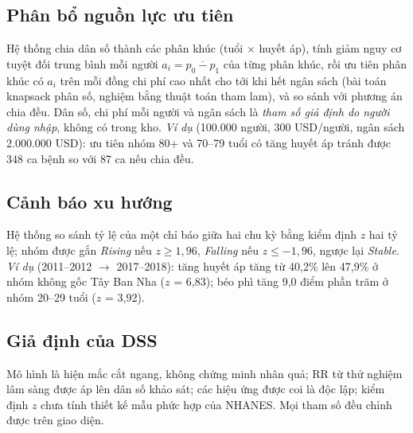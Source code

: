 \subsection{Phân bổ nguồn lực ưu tiên}
Hệ thống chia dân số thành các phân khúc (tuổi $\times$ huyết áp), tính giảm nguy cơ tuyệt đối trung bình mỗi người $a_i=\overline{p_0-p_1}$ của từng phân khúc, rồi ưu tiên phân khúc có $a_i$ trên mỗi đồng chi phí cao nhất cho tới khi hết ngân sách (bài toán knapsack phân số, nghiệm bằng thuật toán tham lam), và so sánh với phương án chia đều. Dân số, chi phí mỗi người và ngân sách là \emph{tham số giả định do người dùng nhập}, không có trong kho. \emph{Ví dụ} (100.000 người, 300 USD/người, ngân sách 2.000.000 USD): ưu tiên nhóm 80+ và 70--79 tuổi có tăng huyết áp tránh được 348 ca bệnh so với 87 ca nếu chia đều.

\subsection{Cảnh báo xu hướng}
Hệ thống so sánh tỷ lệ của một chỉ báo giữa hai chu kỳ bằng kiểm định $z$ hai tỷ lệ; nhóm được gắn \emph{Rising} nếu $z \ge 1{,}96$, \emph{Falling} nếu $z \le -1{,}96$, ngược lại \emph{Stable}. \emph{Ví dụ} (2011--2012 $\rightarrow$ 2017--2018): tăng huyết áp tăng từ 40,2\% lên 47,9\% ở nhóm không gốc Tây Ban Nha ($z$ = 6,83); béo phì tăng 9,0 điểm phần trăm ở nhóm 20--29 tuổi ($z$ = 3,92).

\subsection{Giả định của DSS}
Mô hình là hiện mắc cắt ngang, không chứng minh nhân quả; RR từ thử nghiệm lâm sàng được áp lên dân số khảo sát; các hiệu ứng được coi là độc lập; kiểm định $z$ chưa tính thiết kế mẫu phức hợp của NHANES. Mọi tham số đều chỉnh được trên giao diện.
